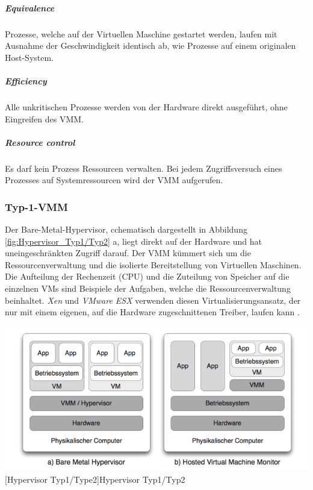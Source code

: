 \subparagraph{Equivalence} 
 Prozesse, welche auf der Virtuellen Maschine gestartet werden, laufen mit Ausnahme der Geschwindigkeit identisch ab, wie Prozesse auf einem originalen Host-System.
 
\subparagraph{Efficiency} 
Alle unkritischen Prozesse werden von der Hardware direkt ausgeführt, ohne Eingreifen des VMM.

\subparagraph{Resource control} 
Es darf kein Prozess Ressourcen verwalten. Bei jedem Zugriffsversuch eines Prozesses auf Systemressourcen wird der VMM aufgerufen.



\subsubsection{Typ-1-VMM}
Der Bare-Metal-Hypervisor, cchematisch dargestellt in Abbildung \ref{fig:Hypervisor_Typ1/Typ2} a, liegt direkt auf der Hardware und hat uneingeschränkten Zugriff darauf. Der VMM kümmert sich um die Ressourcenverwaltung und die isolierte Bereitstellung von Virtuellen Maschinen. Die Aufteilung der Rechenzeit (CPU) und die Zuteilung von Speicher auf die einzelnen VMs sind Beispiele der Aufgaben, welche die Ressourcenverwaltung beinhaltet. \emph{Xen} \cite{Install2018XenArchitecture} und \emph{VMware ESX} \cite{Go-to2018ESXi} verwenden diesen Virtualisierungsansatz, der nur mit einem eigenen, auf die Hardware zugeschnittenen Treiber, laufen kann \cite{Glatz2015Betriebssysteme}.

\vspace{1em}
\begin{minipage}{\linewidth}
	\centering
	\includegraphics[width=1\linewidth]{pics/Hypervisoren.PNG}
	[Hypervisor Typ1/Type2]{Hypervisor Typ1/Typ2 \cite{Meinel2011VirtualisierungMarktubersicht} }
	\label{fig:Hypervisor_Typ1/Typ2}
\end{minipage}


